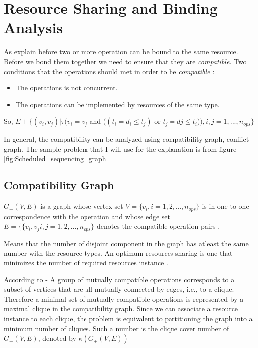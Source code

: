 \section{Resource Sharing and Binding Analysis}

As explain before two or more operation can be bound to the same resource. Before we bond them together we need to ensure that they are \textit{compatible}. Two conditions that the operations should met in order to be \textit{compatible} :

\begin{itemize}
\item The operations is not concurrent.
\item The operations can be implemented by resources of the same type.
\end{itemize}

So, $ E+\{(v_{i},v_{j})|\tau(v_{i}=v_{j} $ and $ ((t_{i}=d_{i} \leq t_{j}) $ or $ t_{j}=d{j} \leq t_{i})),i,j=1,...,n_{ops}\}$ %

In general, the compatibility can be analyzed using compatibility graph, conflict graph. The sample problem that I will use for the explanation is from figure \ref{fig:Scheduled_sequencing_graph}


\subsection{Compatibility Graph}


$G_{+}(V,E)$ is a graph whose vertex set  $  V = \{v_{i}, i = 1,2,..., n_{ops}\} $ is in one to one correspondence with the operation and whose edge set $ E = \{\{v_{i},v_{j} i,j = 1,2,...,n_{ops}\}$ denotes the compatible operation pairs \cite{b1}. 

Means that the number of disjoint component in the graph has atleast the same number with the resource types. An optimum resources sharing is one that minimizes the number of required resources instance \cite{b1}.

According to \cite{b1} - A group of mutually compatible operations corresponds to a subset of vertices that are all mutually connected by edges, i.e., to a clique. Therefore a minimal set of mutually compatible operations is represented by a maximal clique in the compatibility graph. Since we can associate a resource instance to each clique, the problem is equivalent to partitioning the graph into a minimum number of cliques. Such a number is the clique cover number of $G_{+}(V,E)  $, denoted by $\kappa(G_{+}(V,E)) $

